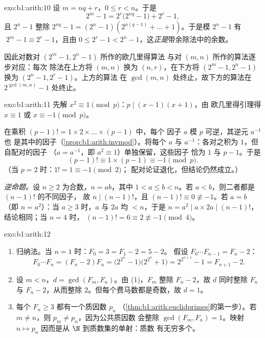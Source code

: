 \begin{solution}{exo:b1:arith:10}
设 $m = nq + r$，$0 \leq r < n$。于是
\[
2^m - 1 = 2^r\bigl(2^{nq} - 1\bigr) + 2^r - 1,
\]
且 $2^n - 1$ 整除 $2^{nq} - 1 = (2^n - 1)(2^{n(q-1)} + \dots +
1)$。于是模 $2^n - 1$ 有 $\;2^m - 1 \equiv 2^r - 1$，且由 $0 \leq
2^r - 1 < 2^n - 1$，这\emph{正是}带余除法中的余数。

因此对数对 $(2^m - 1, 2^n - 1)$ 所作的欧几里得算法
与对 $(m, n)$ 所作的算法逐步对应：每次
除法在上方将 $(m, n)$ 换为 $(n, r)$，在下方将 $(2^m - 1,
2^n - 1)$ 换为 $(2^n - 1, 2^r - 1)$。上方的算法
在 $\gcd(m,n)$ 处终止，故下方的算法在
$2^{\gcd(m,n)} - 1$ 处终止。
\end{solution}

\begin{solution}{exo:b1:arith:11}
先解 $x^2 \equiv 1 \pmod p$：$p \mid (x-1)(x+1)$，由
欧几里得引理得 $x \equiv 1$ 或 $x \equiv -1 \pmod p$。

在乘积 $(p-1)! = 1 \times 2 \times \dots \times (p-1)$ 中，每个
因子 $a$ 模 $p$ 可逆，其逆元 $a^{-1}$ 也
是其中的因子（\cref{prop:b1:arith:invmod}）。将每个 $a$ 与
$a^{-1}$：各对之积为 $1$，但自配对的因子
（$a = a^{-1}$，即 $a^2 \equiv 1$）单独保留，这些因子
恰为 $1$ 与 $p - 1$。于是
\[
(p-1)! \equiv 1 \times (p - 1) \equiv -1 \pmod p .
\]
（当 $p = 2$ 时：$1! = 1 \equiv -1 \pmod 2$；
配对论证退化，但结论仍然成立。）

\emph{逆命题。}设 $n \geq 2$ 为合数，$n = ab$，其中 $1 < a
\leq b < n$。若 $a < b$，则二者都是 $(n-1)!$ 的不同因子，
故 $n \mid (n-1)!$，且 $(n-1)! \equiv 0 \not\equiv -1$。若 $a = b$
（即 $n = a^2$）：当 $a \geq 3$ 时，$a$ 与 $2a$ 均 $< n$，于是
$n = a^2 \mid a \times 2a \mid (n-1)!$，结论相同；当 $n = 4$ 时，
$(n-1)! = 6 \equiv 2 \not\equiv -1 \pmod 4$。
\end{solution}

\begin{solution}{exo:b1:arith:12}
\begin{enumerate}
  \item 归纳法。当 $n = 1$ 时：$F_0 = 3 = F_1 - 2 = 5 - 2$。
        假设 $F_0\cdots F_{n-1} = F_n - 2$：
        \[
        F_0 \cdots F_n = (F_n - 2)F_n
        = \bigl(2^{2^n} - 1\bigr)\bigl(2^{2^n} + 1\bigr)
        = 2^{2^{n+1}} - 1 = F_{n+1} - 2 .
        \]
  \item 设 $m < n$，$d = \gcd(F_m, F_n)$。由 (1)，$F_m$
        整除 $F_n - 2$，故 $d$ 同时整除 $F_n$ 与 $F_n -
        2$，从而整除 $2$。但每个费马数都是奇数，故
        $d = 1$。
  \item 每个 $F_n \geq 3$ 都有一个质因数 $p_n$
        （\cref{thm:b1:arith:euclidprimes}的第一步）。若 $m
        \neq n$，则 $p_m \neq p_n$，因为公共质因数
        会整除 $\gcd(F_m, F_n) = 1$。映射 $n \mapsto p_n$
        因而是从 $\N$ 到质数集的单射：质数
        有无穷多个。
\end{enumerate}
\end{solution}

